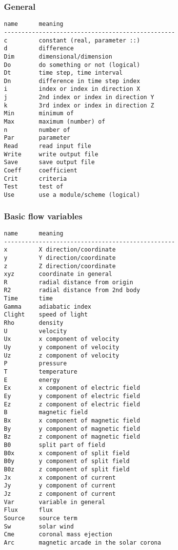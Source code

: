 \subsubsection{General}

\begin{verbatim}
name      meaning
-------------------------------------------------
c         constant (real, parameter ::)
d         difference
Dim       dimensional/dimension
Do        do something or not (logical)
Dt        time step, time interval
Dn        difference in time step index
i         index or index in direction X
j         2nd index or index in direction Y
k         3rd index or index in direction Z
Min       minimum of
Max       maximum (number) of
n         number of
Par       parameter
Read      read input file
Write     write output file
Save      save output file
Coeff     coefficient
Crit      criteria
Test      test of
Use       use a module/scheme (logical)
\end{verbatim}

\subsubsection{Basic flow variables}

\begin{verbatim}
name      meaning
-------------------------------------------------
x         X direction/coordinate
y         Y direction/coordinate
z         Z direction/coordinate
xyz       coordinate in general
R         radial distance from origin
R2        radial distance from 2nd body
Time      time
Gamma     adiabatic index
Clight    speed of light
Rho       density
U         velocity
Ux        x component of velocity
Uy        y component of velocity
Uz        z component of velocity
P         pressure
T         temperature
E         energy
Ex        x component of electric field
Ey        y component of electric field
Ez        z component of electric field
B         magnetic field
Bx        x component of magnetic field
By        y component of magnetic field
Bz        z component of magnetic field
B0        split part of field
B0x       x component of split field
B0y       y component of split field
B0z       z component of split field
Jx        x component of current
Jy        y component of current
Jz        z component of current
Var       variable in general
Flux      flux
Source    source term
Sw        solar wind
Cme       coronal mass ejection
Arc       magnetic arcade in the solar corona 
\end{verbatim}

